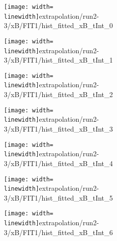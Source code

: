 \begin{figure}
\begin{subfigure}{0.45\linewidth}
\texttt{[image: width=\\linewidth]}{extrapolation/run2-3/xB/FIT1/hist_fitted_xB_tInt_0}
\end{subfigure}
\begin{subfigure}{0.45\linewidth}
\texttt{[image: width=\\linewidth]}{extrapolation/run2-3/xB/FIT1/hist_fitted_xB_tInt_1}
\end{subfigure}
\begin{subfigure}{0.45\linewidth}
\texttt{[image: width=\\linewidth]}{extrapolation/run2-3/xB/FIT1/hist_fitted_xB_tInt_2}
\end{subfigure}
\begin{subfigure}{0.45\linewidth}
\texttt{[image: width=\\linewidth]}{extrapolation/run2-3/xB/FIT1/hist_fitted_xB_tInt_3}
\end{subfigure}
\begin{subfigure}{0.45\linewidth}
\texttt{[image: width=\\linewidth]}{extrapolation/run2-3/xB/FIT1/hist_fitted_xB_tInt_4}
\end{subfigure}
\begin{subfigure}{0.45\linewidth}
\texttt{[image: width=\\linewidth]}{extrapolation/run2-3/xB/FIT1/hist_fitted_xB_tInt_5}
\end{subfigure}
\begin{subfigure}{0.45\linewidth}
\texttt{[image: width=\\linewidth]}{extrapolation/run2-3/xB/FIT1/hist_fitted_xB_tInt_6}
\end{subfigure}
\end{figure}
